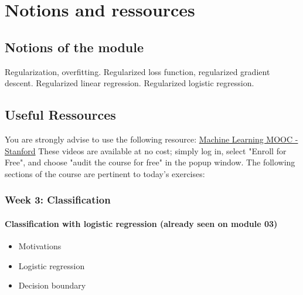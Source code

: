 

\chapter*{Notions and ressources}

\section*{Notions of the module}
Regularization, overfitting. Regularized loss function, regularized gradient descent.  
Regularized linear regression. Regularized logistic regression.

\section*{Useful Ressources}

You are strongly advise to use the following resource:
\href{https://www.coursera.org/learn/machine-learning}{Machine Learning MOOC - Stanford}
These videos are available at no cost; simply log in, select "Enroll for Free", and choose "audit the course for free" in the popup window.
The following sections of the course are pertinent to today's exercises:

\subsection*{Week 3: Classification}

\subsubsection*{Classification with logistic regression (already seen on module 03)}
\begin{itemize}
  \item Motivations
  \item Logistic regression
  \item Decision boundary
\end{itemize}

